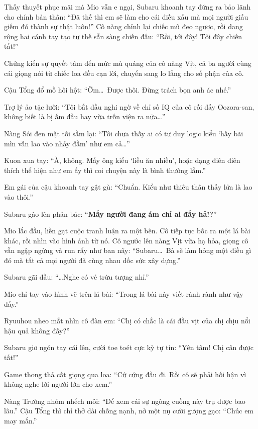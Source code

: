 \documentclass[../main.tex]{subfiles}
\begin{document}
Thấy thuyết phục mãi mà Mio vẫn e ngại, Subaru khoanh tay đứng ra bảo lãnh cho chính bản thân: ``Đã thế thì em sẽ làm cho cái điều xấu mà mọi người giấu giếm đó thành sự thật luôn!'' Cô nàng chỉnh lại chiếc mũ đeo ngược, rồi dang rộng hai cánh tay tạo tư thế sẵn sàng chiến đấu: ``Rồi, tới đây! Tôi đây chiến tất!''

Chứng kiến sự quyết tâm đến mức mù quáng của cô nàng Vịt, cả ba người cùng cái giọng nói từ chiếc loa đều cạn lời, chuyển sang lo lắng cho số phận của cô.

Cậu Tổng đổ mồ hôi hột: ``Ờm\dots\ Được thôi. Đừng trách bọn anh ác nhé.''

Trợ lý ảo tặc lưỡi: ``Tôi bắt đầu nghi ngờ về chỉ số IQ của cô rồi đấy Oozora-san, không biết là bị ấm đầu hay vừa trốn viện ra nữa\dots''

Nàng Sói đen mặt tối sầm lại: ``Tôi chưa thấy ai có tư duy logic kiểu `hấy bãi mìn vẫn lao vào nhảy đầm' như em cả\dots''


Kuon xua tay: ``À, không. Mấy ông kiểu `liều ăn nhiều', hoặc dạng điên điên thích thể hiện như em ấy thì coi chuyện này là bình thường lắm.''

Em gái của cậu khoanh tay gật gù: ``Chuẩn. Kiểu như thiêu thân thấy lửa là lao vào thôi.''

Subaru gào lên phản bác: ``\textbf{Mấy người đang ám chỉ ai đấy hả!?}''

Mio lắc đầu, liền gạt cuộc tranh luận ra một bên. Cô tiếp tục bốc ra một lá bài khác, rồi nhìn vào hình ảnh từ nó. Cô ngước lên nàng Vịt vừa hạ hỏa, giọng cô vẫn ngập ngừng và run rẩy như ban nãy: ``Subaru\dots\ Bà sẽ làm hỏng một điều gì đó mà tất cả mọi người đã cùng nhau dốc sức xây dựng.''

Subaru gãi đầu: ``\dots Nghe có vẻ trừu tượng nhỉ.''

Mio chỉ tay vào hình vẽ trên lá bài: ``Trong lá bài này viết rành rành như vậy đấy.''

Ryuuhou nheo mắt nhìn cô đàn em: ``Chị có chắc là cái đầu vịt của chị chịu nổi hậu quả không đấy?''

Subaru giơ ngón tay cái lên, cười toe toét cực kỳ tự tin: ``Yên tâm! Chị cân được tất!''

Game thong thả cất giọng qua loa: ``Cứ cứng đầu đi. Rồi cô sẽ phải hối hận vì không nghe lời người lớn cho xem.''

Nàng Trưởng nhóm nhếch môi: ``Để xem cái sự ngông cuồng này trụ được bao lâu.'' Cậu Tổng thì chỉ thở dài chống nạnh, nở một nụ cười gượng gạo: ``Chúc em may mắn.''
\end{document}
